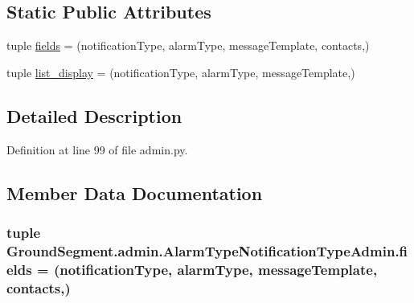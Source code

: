 \subsection*{Static Public Attributes}
\begin{DoxyCompactItemize}
\item 
tuple \hyperlink{class_ground_segment_1_1admin_1_1_alarm_type_notification_type_admin_ab3af7d89ca887c04a133e2a55d166e62}{fields} = (\textquotesingle{}notification\+Type\textquotesingle{}, \textquotesingle{}alarm\+Type\textquotesingle{}, \textquotesingle{}message\+Template\textquotesingle{}, \textquotesingle{}contacts\textquotesingle{},)
\item 
tuple \hyperlink{class_ground_segment_1_1admin_1_1_alarm_type_notification_type_admin_ac52ed410fef4e7f5105e37235b7453ee}{list\+\_\+display} = (\textquotesingle{}notification\+Type\textquotesingle{}, \textquotesingle{}alarm\+Type\textquotesingle{}, \textquotesingle{}message\+Template\textquotesingle{},)
\end{DoxyCompactItemize}


\subsection{Detailed Description}


Definition at line 99 of file admin.\+py.



\subsection{Member Data Documentation}
\hypertarget{class_ground_segment_1_1admin_1_1_alarm_type_notification_type_admin_ab3af7d89ca887c04a133e2a55d166e62}{}
\subsubsection[{fields}]{\setlength{\rightskip}{0pt plus 5cm}tuple Ground\+Segment.\+admin.\+Alarm\+Type\+Notification\+Type\+Admin.\+fields = (\textquotesingle{}notification\+Type\textquotesingle{}, \textquotesingle{}alarm\+Type\textquotesingle{}, \textquotesingle{}message\+Template\textquotesingle{}, \textquotesingle{}contacts\textquotesingle{},)\hspace{0.3cm}{\ttfamily [static]}}\label{class_ground_segment_1_1admin_1_1_alarm_type_notification_type_admin_ab3af7d89ca887c04a133e2a55d166e62}



